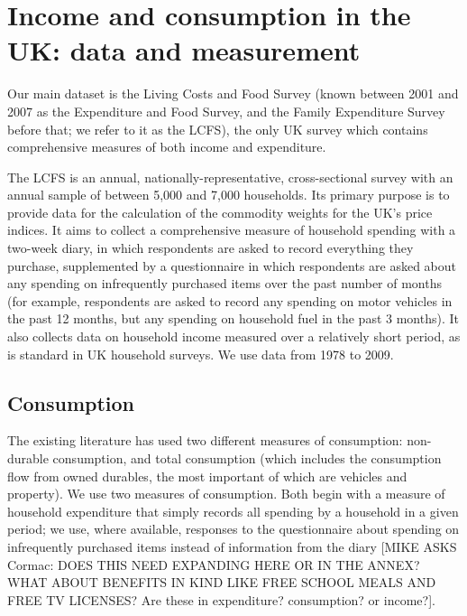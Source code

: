 \section{Income and consumption in the UK: data and measurement}\label{sec:measure}

Our main dataset is the Living Costs and Food Survey (known between 2001 and 2007 as the Expenditure and Food Survey, and the Family Expenditure Survey before that; we refer to it as the LCFS), the only UK survey which contains comprehensive measures of both income and expenditure.

The LCFS is an annual, nationally-representative, cross-sectional survey with an annual sample of between 5,000 and 7,000 households. Its primary purpose is to provide data for the calculation of the commodity  weights for the UK's price indices. It aims to collect a comprehensive measure of household spending with a two-week diary, in which respondents are asked to record everything they  purchase, supplemented by a questionnaire in which respondents are asked about any spending on infrequently purchased items over the past number of months (for example, respondents are asked to record any spending on motor vehicles in the past 12 months, but any spending on household fuel in the past 3 months). It also collects data on household income measured over a relatively short period, as is standard in UK household surveys. We use data from 1978 to 2009.

\subsection{Consumption}
The existing literature has used two different measures of consumption: non-durable consumption, and total consumption (which includes the consumption flow from owned durables, the most important of which are vehicles and property). We use two measures of consumption. Both begin with a measure of household expenditure that simply records all spending by a household in a given period; we use, where available, responses to the questionnaire about spending on infrequently purchased items instead of information from the diary  [MIKE ASKS Cormac: DOES THIS NEED EXPANDING HERE OR IN THE ANNEX? WHAT ABOUT BENEFITS IN KIND LIKE FREE SCHOOL MEALS AND FREE TV LICENSES? Are these in expenditure? consumption? or income?]. 

